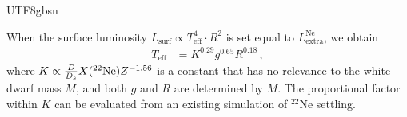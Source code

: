 \documentclass[twocolumn, times, trackchanges]{aastex63_bren}
\begin{document}
\begin{CJK*}{UTF8}{gbsn}
\begin{appendix}
When the surface luminosity $L_\text{surf} \propto T_\text{eff}^4\cdot R^2$ is set equal to $L^\text{Ne}_\text{extra}$, we obtain
\begin{align}
    T_\text{eff} &= K^{0.29} g^{0.65} R^{0.18}\,,
\end{align}
where $K \propto \frac{D}{D_s} X(^{22}{\rm Ne}) Z^{-1.56}$ is a constant that has no relevance to the white dwarf mass $M$, and both $g$ and $R$ are determined by $M$. The proportional factor within $K$ can be evaluated from an existing simulation of $^{22}$Ne settling.

\end{appendix}



\end{CJK*}
\end{document}
